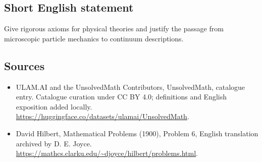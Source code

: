 \documentclass[11pt]{article}
\begin{document}
\subsection{Short English statement}
Give rigorous axioms for physical theories and justify the passage from microscopic particle mechanics to continuum descriptions.
\subsection{Sources}
\begin{itemize}
\item[\hypertarget{source:statement:1}{S1}] ULAM.AI and the UnsolvedMath Contributors, UnsolvedMath, catalogue entry. Catalogue curation under CC BY 4.0; definitions and English exposition added locally.
\url{https://huggingface.co/datasets/ulamai/UnsolvedMath}.
\item[\hypertarget{source:statement:2}{S2}] David Hilbert, Mathematical Problems (1900), Problem 6, English translation archived by D. E. Joyce.
\url{https://mathcs.clarku.edu/~djoyce/hilbert/problems.html}.
\end{itemize}
\label{end:statement}
\end{document}
